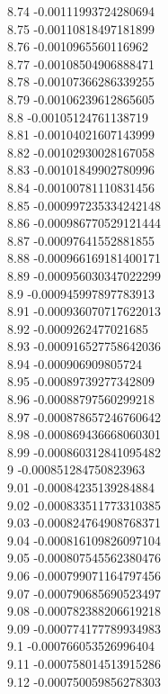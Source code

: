 {8.74	-0.00111993724280694\\
8.75	-0.00110818497181899\\
8.76	-0.0010965560116962\\
8.77	-0.00108504906888471\\
8.78	-0.00107366286339255\\
8.79	-0.00106239612865605\\
8.8	-0.00105124761138719\\
8.81	-0.00104021607143999\\
8.82	-0.00102930028167058\\
8.83	-0.00101849902780996\\
8.84	-0.00100781110831456\\
8.85	-0.000997235334242148\\
8.86	-0.000986770529121444\\
8.87	-0.00097641552881855\\
8.88	-0.000966169181400171\\
8.89	-0.000956030347022299\\
8.9	-0.000945997897783913\\
8.91	-0.000936070717622013\\
8.92	-0.0009262477021685\\
8.93	-0.000916527758642036\\
8.94	-0.000906909805724\\
8.95	-0.00089739277342809\\
8.96	-0.00088797560299218\\
8.97	-0.000878657246760642\\
8.98	-0.000869436668060301\\
8.99	-0.000860312841095482\\
9	-0.000851284750823963\\
9.01	-0.00084235139284884\\
9.02	-0.000833511773310385\\
9.03	-0.000824764908768371\\
9.04	-0.000816109826097104\\
9.05	-0.000807545562380476\\
9.06	-0.000799071164797456\\
9.07	-0.000790685690523497\\
9.08	-0.000782388206619218\\
9.09	-0.000774177789934983\\
9.1	-0.000766053526996404\\
9.11	-0.000758014513915286\\
9.12	-0.000750059856278303\\
}

